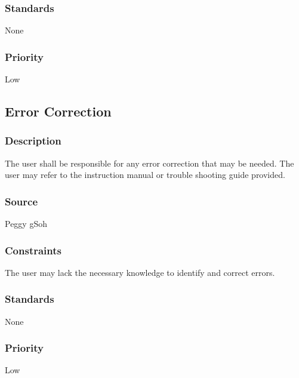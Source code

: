 \subsubsection{Standards}
None
\subsubsection{Priority}
Low


\subsection{Error Correction}
\subsubsection{Description}
The user shall be responsible for any error correction that may be needed. The user may refer to the instruction manual or trouble shooting guide provided.
\subsubsection{Source}
Peggy gSoh
\subsubsection{Constraints}
The user may lack the necessary knowledge to identify and correct errors.
\subsubsection{Standards}
None
\subsubsection{Priority}
Low
